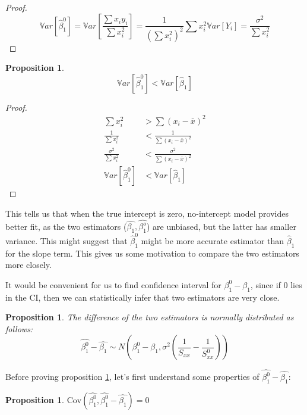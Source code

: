 \documentclass[12pt,a4paper,oneside]{book} %
\newtheorem{proposition}[theorem]{Proposition}
\newcommand{\Cov}{\mathrm{Cov}}
\begin{document}
	\begin{proof}
		\[
		\mathbb{V}ar[\hat{\beta}_1^0] =  \mathbb{V}ar[\frac{\sum x_i y_i}{\sum x_i^2}] = \frac{1}{(\sum x_i^2)^2} \sum x_i^2 \mathbb{V}ar[Y_i] = \frac{\sigma^2}{\sum x_i^2}
		\]
	\end{proof}


	\begin{proposition}
		\[
			\mathbb{V}ar[\hat{\beta}_1^0] < \mathbb{V}ar[\hat{\beta}_1]
		\]
	\end{proposition}

	\begin{proof}
		\begin{align*}
			\sum x_i^2 &> \sum (x_i - \bar{x})^2  \\
			\frac{1}{\sum x_i^2}  &< \frac{1}{\sum (x_i - \bar{x})^2}  \\
			\frac{\sigma^2}{\sum x_i^2}  &< \frac{\sigma^2}{\sum (x_i - \bar{x})^2}  \\
			\mathbb{V}ar[\hat{\beta}_1^0] &< \mathbb{V}ar[\hat{\beta}_1] 
		\end{align*}
	\end{proof}

This tells us that when the true intercept is zero, no-intercept model provides better fit, as the two estimators ($\hat{\beta_1}, \hat{\beta_1^o}$) are unbiased, but the latter has smaller variance. 
This might suggest that $\hat{\beta}_1^0$ might be more accurate estimator than $\hat{\beta}_1$ for the slope term. This gives us some motivation to compare the two estimators more closely.

It would be convenient for us to find confidence interval for $\beta_1^0 - \beta_1$, since if 0 lies in the CI, then we can statistically infer that two estimators are very close.

\begin{proposition} \label{prop:normally}
	The difference of the two estimators is normally distributed as follows: 
	\[
		\hat{\beta_1^0}-\hat{\beta_1} \sim N(\beta_1^0-\beta_1, \sigma^2(\frac{1}{S_{xx}}-\frac{1}{S_{xx}^0}))
	\]
\end{proposition}

	Before proving proposition \ref{prop:normally}, let's first understand some properties of $\hat{\beta_1^0}-\hat{\beta_1}$:

\begin{proposition}
	$\Cov (\hat{\beta_1^0},\hat{\beta_1^0}-\hat{\beta_1})=0$
\end{proposition}
\end{document}
